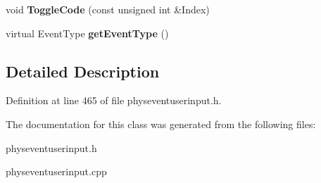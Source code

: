 \begin{DoxyCompactItemize}
\item 
\hypertarget{classPhysEventUserInput_a2e8e56d7e25deaf0e5f9672a780489a2}{
void {\bfseries ToggleCode} (const unsigned int \&Index)}
\label{dc/d0e/classPhysEventUserInput_a2e8e56d7e25deaf0e5f9672a780489a2}

\item 
\hypertarget{classPhysEventUserInput_a7adabb15e8012a86c9da1910033eea4b}{
virtual EventType {\bfseries getEventType} ()}
\label{dc/d0e/classPhysEventUserInput_a7adabb15e8012a86c9da1910033eea4b}

\end{DoxyCompactItemize}


\subsection{Detailed Description}


Definition at line 465 of file physeventuserinput.h.

The documentation for this class was generated from the following files:\begin{DoxyCompactItemize}
\item 
physeventuserinput.h\item 
physeventuserinput.cpp\end{DoxyCompactItemize}
